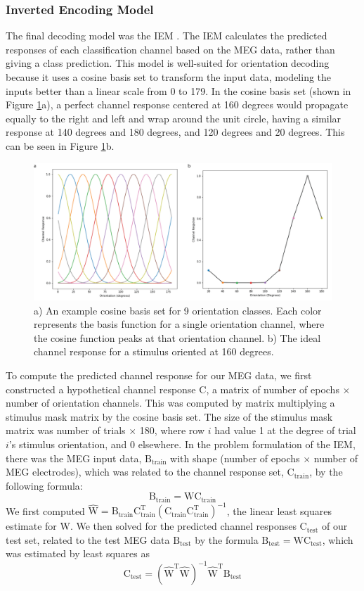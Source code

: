 \documentclass[../main.tex]{subfiles}
\begin{document}
\subsubsection*{Inverted Encoding Model}
The final decoding model was the IEM \citep{Brouwer09, Brouwer, GARCIA2013515,sprague_serences_2013, sprague_saproo_serences_2015}. The IEM calculates the predicted responses of each classification channel based on the MEG data, rather than giving a class prediction. This model is well-suited for orientation decoding because it uses a cosine basis set to transform the input data, modeling the inputs better than a linear scale from 0 to 179. In the cosine basis set (shown in Figure \ref{basis_set}a), a perfect channel response centered at 160 degrees would propagate equally to the right and left and wrap around the unit circle, having a similar response at 140 degrees and 180 degrees, and 120 degrees and 20 degrees. This can be seen in Figure \ref{basis_set}b.

\begin{figure}
    \centering
    \includegraphics[scale=0.7]{figures/methods/basis_set.png}
    \caption{a) An example cosine basis set for 9 orientation classes. Each color represents the basis function for a single orientation channel, where the cosine function peaks at that orientation channel. b) The ideal channel response for a stimulus oriented at 160 degrees.}
    \label{basis_set}
\end{figure}

To compute the predicted channel response for our MEG data, we first constructed a hypothetical channel response $\mathrm{C}$, a matrix of number of epochs $\times$ number of orientation channels. This was computed by matrix multiplying a stimulus mask matrix by the cosine basis set. The size of the stimulus mask matrix was number of trials $\times$ 180, where row $i$ had value 1 at the degree of trial $i$'s stimulus orientation, and 0 elsewhere. In the problem formulation of the IEM, there was the MEG input data, $\mathrm{B_{train}}$ with shape (number of epochs $\times$ number of MEG electrodes), which was related to the channel response set, $\mathrm{C_{train}}$, by the following formula:
$$ \mathrm{B_{train} = W C_{train}}$$
We first computed $\mathrm{\hat{W} = B_{train} C_{train}^T (C_{train} C_{train}^T)^{-1}}$, the linear least squares estimate for W. We then solved for the predicted channel responses $\mathrm{C_{test}}$  of our test set, related to the test MEG data $\mathrm{B_{test}}$ by the formula $\mathrm{B_{test} = W C_{test}}$, which was estimated by least squares as 
$$\mathrm{C_{test} = (\hat{W}^T \hat{W})^{-1} \hat{W}^T B_{test}}$$
\end{document}

